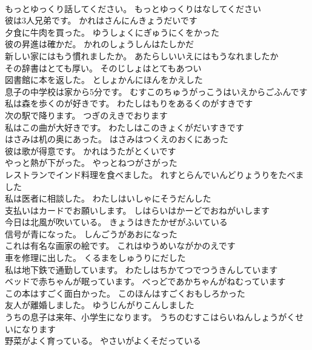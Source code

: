 \documentclass[8pt]{extreport}
\begin{document}
\begin{CJK}{UTF8}{min}
\\	もっとゆっくり話してください。	もっとゆっくりはなしてください 
\\	彼は3人兄弟です。	かれはさんにんきょうだいです 
\\	夕食に牛肉を買った。	ゆうしょくにぎゅうにくをかった 
\\	彼の昇進は確かだ。	かれのしょうしんはたしかだ 
\\	新しい家にはもう慣れましたか。	あたらしいいえにはもうなれましたか 
\\	その辞書はとても厚い。	そのじしょはとてもあつい 
\\	図書館に本を返した。	としょかんにほんをかえした 
\\	息子の中学校は家から5分です。	むすこのちゅうがっこうはいえからごふんです 
\\	私は森を歩くのが好きです。	わたしはもりをあるくのがすきです 
\\	次の駅で降ります。	つぎのえきでおります 
\\	私はこの曲が大好きです。	わたしはこのきょくがだいすきです 
\\	はさみは机の奥にあった。	はさみはつくえのおくにあった 
\\	彼は歌が得意です。	かれはうたがとくいです 
\\	やっと熱が下がった。	やっとねつがさがった 
\\	レストランでインド料理を食べました。	れすとらんでいんどりょうりをたべました 
\\	私は医者に相談した。	わたしはいしゃにそうだんした 
\\	支払いはカードでお願いします。	しはらいはかーどでおねがいします 
\\	今日は北風が吹いている。	きょうはきたかぜがふいている 
\\	信号が青になった。	しんごうがあおになった 
\\	これは有名な画家の絵です。	これはゆうめいながかのえです 
\\	車を修理に出した。	くるまをしゅうりにだした 
\\	私は地下鉄で通勤しています。	わたしはちかてつでつうきんしています 
\\	ベッドで赤ちゃんが眠っています。	べっどであかちゃんがねむっています 
\\	この本はすごく面白かった。	このほんはすごくおもしろかった 
\\	友人が離婚しました。	ゆうじんがりこんしました 
\\	うちの息子は来年、小学生になります。	うちのむすこはらいねんしょうがくせいになります 
\\	野菜がよく育っている。	やさいがよくそだっている 

\end{CJK}
\end{document}
